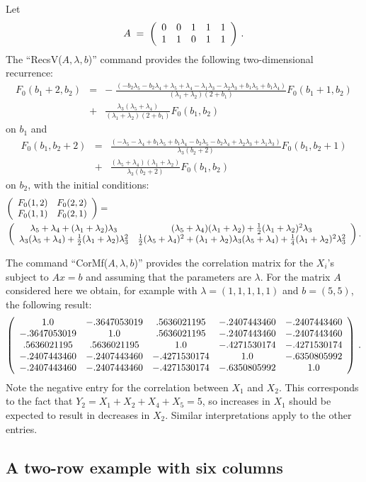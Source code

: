 \documentclass[11pt]{article}
\newcommand{\be}[1]{\begin{equation}\label{#1}}
\newcommand{\ee}{\end{equation}}
\newcommand{\beqn}{\begin{eqnarray*}}
\newcommand{\eeqn}{\end{eqnarray*}}
\newcommand{\oneh}{\frac{1}{2}}
\newcommand{\oneq}{\frac{1}{4}}
\newcommand{\mypmatrix}[1]{\left(\begin{array}{cccccccccccc}#1\end{array}\right)}
\begin{document}
Let
\be{eqn:ARL}
A\;=\;\mypmatrix{0 & 0 & 1 & 1 & 1\cr
               1 & 1 & 0 & 1 & 1}\,.
\ee
The ``RecsV($A, \lambda , b$)'' command provides the following two-dimensional
recurrence:
\beqn
F_0(b_1+2, b_2)
&=&
- \;
\frac{(-b_2\lambda _5-b_2\lambda _4+\lambda _5+\lambda _4-\lambda _1\lambda _3-\lambda _2\lambda _3+b_1\lambda _5+b_1\lambda _4)}{(\lambda _1+\lambda _2)(2+b_1)}
F_0(b_1+1, b_2)\\
&+&
\frac{\lambda _3(\lambda _5+\lambda _4)}{(\lambda _1+\lambda _2)(2+b_1)}
F_0(b_1, b_2)
\eeqn
on $b_1$ and
\beqn
F_0(b_1, b_2+2) 
&=&
\frac{(-\lambda _5-\lambda _4+b_1\lambda _5+b_1\lambda _4-b_2\lambda _5-b_2\lambda _4+\lambda _2\lambda _3+\lambda _1\lambda _3)}{\lambda _3(b_2+2)}
F_0(b_1, b_2+1)
\\
&+&
\frac{(\lambda _5+\lambda _4)(\lambda _1+\lambda _2)}{\lambda _3(b_2+2)}
F_0(b_1, b_2)
\eeqn
on $b_2$, with the initial conditions:
\beqn
\mypmatrix{
F_0(1,2) & F_0(2,2)\cr
F_0(1,1) & F_0(2,1)}
&=&
\\
&&
\hspace{-120pt}
\mypmatrix{\lambda _5+\lambda _4+(\lambda _1+\lambda _2)\lambda _3 & (\lambda _5+\lambda _4)(\lambda _1+\lambda _2)+\oneh(\lambda _1+\lambda _2)^2\lambda _3\cr
\lambda _3(\lambda _5+\lambda _4)+\oneh(\lambda _1+\lambda _2)\lambda _3^2 &
\oneh(\lambda _5+\lambda _4)^2+(\lambda _1+\lambda _2)\lambda _3(\lambda _5+\lambda _4)+\oneq(\lambda _1+\lambda _2)^2\lambda _3^2}.
\eeqn

The command ``CorMf($A,\lambda ,b$)'' provides the correlation matrix for the $X_i$'s
subject to $Ax=b$ and assuming that the parameters are $\lambda $.
For the matrix $A$ considered here we obtain, for example with
$\lambda =(1,1,1,1,1)$ and $b=(5,5)$, the following result:
\[
\mypmatrix{
1.0& -.3647053019& .5636021195& -.2407443460& -.2407443460\cr
-.3647053019& 1.0& .5636021195& -.2407443460& -.2407443460\cr
.5636021195& .5636021195& 1.0& -.4271530174& -.4271530174\cr
-.2407443460& -.2407443460& -.4271530174& 1.0& -.6350805992\cr
-.2407443460& -.2407443460& -.4271530174& -.6350805992& 1.0}\,.
\]
Note the negative entry for the correlation between $X_1$ and $X_2$.
This corresponds to the fact that
$Y_2 = X_1+ X_2 + X_4 + X_5 = 5$,
so increases in $X_1$ should be expected to result in decreases in $X_2$.
Similar   interpretations apply to the other entries.

\subsection{A two-row example with six columns}
\end{document}
